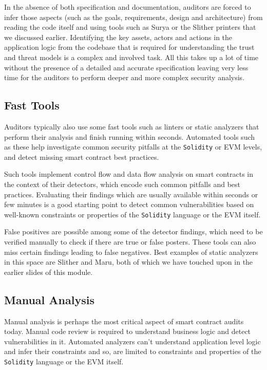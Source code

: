 In the absence of both specification and documentation, auditors are
forced to infer those aspects (such as the goals, requirements, design
and architecture) from reading the code itself and using tools such as
Surya or the Slither printers that we discussed earlier. Identifying the
key assets, actors and actions in the application logic from the
codebase that is required for understanding the trust and threat models
is a complex and involved task. All this takes up a lot of time without
the presence of a detailed and accurate specification leaving very less
time for the auditors to perform deeper and more complex security
analysis.

\subsection{Fast Tools}\label{fast-tools}

Auditors typically also use some fast tools such as linters or static
analyzers that perform their analysis and finish running within seconds.
Automated tools such as these help investigate common security pitfalls
at the \texttt{Solidity} or EVM levels, and detect missing smart
contract best practices.

Such tools implement control flow and data flow analysis on smart
contracts in the context of their detectors, which encode such common
pitfalls and best practices. Evaluating their findings which are usually
available within seconds or few minutes is a good starting point to
detect common vulnerabilities based on well-known constraints or
properties of the \texttt{Solidity} language or the EVM itself.

False positives are possible among some of the detector findings, which
need to be verified manually to check if there are true or false
posters. These tools can also miss certain findings leading to false
negatives. Best examples of static analyzers in this space are Slither
and Maru, both of which we have touched upon in the earlier slides of
this module.

\subsection{Manual Analysis}\label{manual-analysis}

Manual analysis is perhaps the most critical aspect of smart contract
audits today. Manual code review is required to understand business
logic and detect vulnerabilities in it. Automated analyzers can't
understand application level logic and infer their constraints and so,
are limited to constraints and properties of the \texttt{Solidity}
language or the EVM itself.

